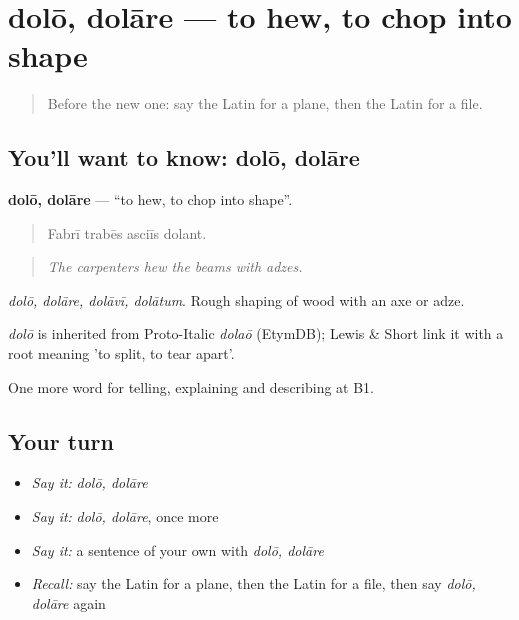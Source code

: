 \section[dolō, dolāre]{dolō, dolāre — to hew, to chop into shape}

\label{lesson:LA-C470-dolo}



\begin{quote}
Before the new one: say the Latin for a plane, then the Latin for a file.
\end{quote}

\subsection*{You'll want to know: dolō, dolāre}
\textbf{dolō, dolāre} — \textquotedblleft{}to hew, to chop into shape\textquotedblright{}.

\begin{quote}
Fabrī trabēs asciīs dolant.
\end{quote}

\begin{quote}
\emph{The carpenters hew the beams with adzes.}
\end{quote}

\emph{dolō, dolāre, dolāvī, dolātum}. Rough shaping of wood with an axe or adze.

\begin{cousinweb}
\emph{dolō} is inherited from Proto-Italic \emph{dolaō} (EtymDB); Lewis \& Short link it with a root meaning 'to split, to tear apart'.
\end{cousinweb}

\begin{grammarlens}[title={What you've built}]
One more word for telling, explaining and describing at B1.
\end{grammarlens}

\subsection*{Your turn}
\begin{itemize}
\raggedright
  \item \emph{Say it:} \emph{dolō, dolāre}
  \item \emph{Say it:} \emph{dolō, dolāre}, once more
  \item \emph{Say it:} a sentence of your own with \emph{dolō, dolāre}
  \item \emph{Recall:} say the Latin for a plane, then the Latin for a file, then say \emph{dolō, dolāre} again
\end{itemize}

